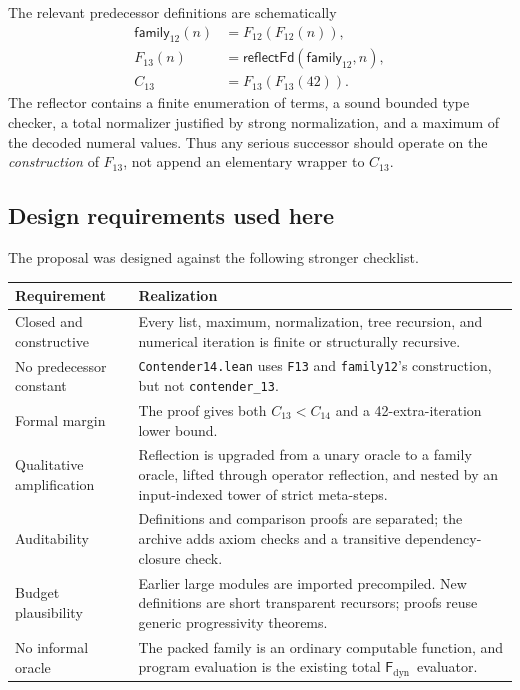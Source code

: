 \documentclass[11pt]{article}
\theoremstyle{definition}
\newcommand{\Fd}{\ensuremath{\mathsf{F}_{\mathrm{dyn}}}}
\newcommand{\lean}[1]{\texttt{#1}}
\begin{document}
The relevant predecessor definitions are schematically
\begin{align*}
  \mathsf{family}_{12}(n) &= F_{12}(F_{12}(n)),\\
  F_{13}(n) &= \mathsf{reflectFd}(\mathsf{family}_{12},n),\\
  C_{13} &= F_{13}(F_{13}(42)).
\end{align*}
The reflector contains a finite enumeration of terms, a sound bounded type
checker, a total normalizer justified by strong normalization, and a maximum of
the decoded numeral values.  Thus any serious successor should operate on the
\emph{construction} of $F_{13}$, not append an elementary wrapper to $C_{13}$.

\subsection{Design requirements used here}

The proposal was designed against the following stronger checklist.

\begin{longtable}{>{\raggedright\arraybackslash}p{}
                  >{\raggedright\arraybackslash}p{}}
\toprule
Requirement & Realization \\
\midrule
\endhead
Closed and constructive & Every list, maximum, normalization, tree recursion,
and numerical iteration is finite or structurally recursive. \\
No predecessor constant & \lean{Contender14.lean} uses \lean{F13} and
\lean{family12}'s construction, but not \lean{contender\_13}. \\
Formal margin & The proof gives both $C_{13}<C_{14}$ and a 42-extra-iteration
lower bound. \\
Qualitative amplification & Reflection is upgraded from a unary oracle to a
family oracle, lifted through operator reflection, and nested by an
input-indexed tower of strict meta-steps. \\
Auditability & Definitions and comparison proofs are separated; the archive
adds axiom checks and a transitive dependency-closure check. \\
Budget plausibility & Earlier large modules are imported precompiled.  New
definitions are short transparent recursors; proofs reuse generic progressivity
theorems. \\
No informal oracle & The packed family is an ordinary computable function, and
program evaluation is the existing total \Fd\ evaluator. \\
\bottomrule
\end{longtable}
\end{document}
